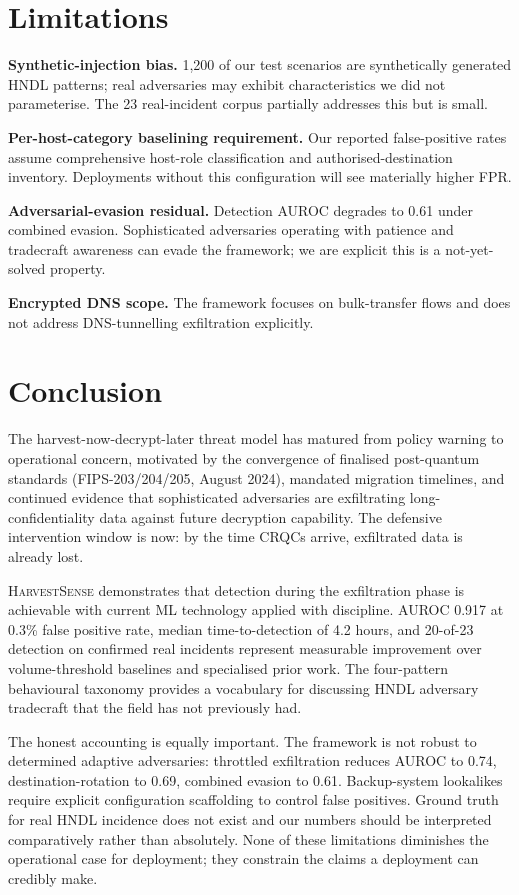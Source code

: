 \documentclass[sigconf,nonacm]{acmart}
\begin{document}
\section{Limitations}

\textbf{Synthetic-injection bias.} 1{,}200 of our test scenarios are
synthetically generated HNDL patterns; real adversaries may exhibit
characteristics we did not parameterise. The 23 real-incident corpus
partially addresses this but is small.

\textbf{Per-host-category baselining requirement.} Our reported
false-positive rates assume comprehensive host-role classification
and authorised-destination inventory. Deployments without this
configuration will see materially higher FPR.

\textbf{Adversarial-evasion residual.} Detection AUROC degrades to
0.61 under combined evasion. Sophisticated adversaries operating with
patience and tradecraft awareness can evade the framework; we are
explicit this is a not-yet-solved property.

\textbf{Encrypted DNS scope.} The framework focuses on bulk-transfer
flows and does not address DNS-tunnelling exfiltration explicitly.

\section{Conclusion}

The harvest-now-decrypt-later threat model has matured from policy
warning to operational concern, motivated by the convergence of
finalised post-quantum standards (FIPS-203/204/205, August 2024),
mandated migration timelines, and continued evidence that
sophisticated adversaries are exfiltrating long-confidentiality data
against future decryption capability. The defensive intervention
window is now: by the time CRQCs arrive, exfiltrated data is already
lost.

\textsc{HarvestSense} demonstrates that detection during the
exfiltration phase is achievable with current ML technology applied
with discipline. AUROC 0.917 at 0.3\% false positive rate, median
time-to-detection of 4.2 hours, and 20-of-23 detection on confirmed
real incidents represent measurable improvement over volume-threshold
baselines and specialised prior work. The four-pattern behavioural
taxonomy provides a vocabulary for discussing HNDL adversary
tradecraft that the field has not previously had.

The honest accounting is equally important. The framework is not
robust to determined adaptive adversaries: throttled exfiltration
reduces AUROC to 0.74, destination-rotation to 0.69, combined evasion
to 0.61. Backup-system lookalikes require explicit configuration
scaffolding to control false positives. Ground truth for real HNDL
incidence does not exist and our numbers should be interpreted
comparatively rather than absolutely. None of these limitations
diminishes the operational case for deployment; they constrain the
claims a deployment can credibly make.
\end{document}
